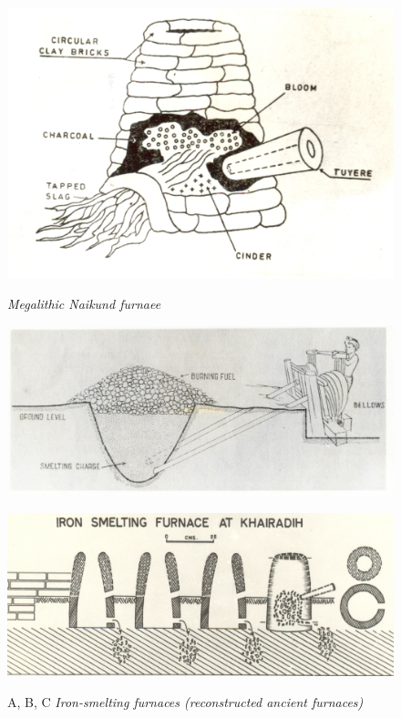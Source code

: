 \begin{figure}[H]
\includegraphics[scale=.65]{images/chapter-3/fig002a.jpg}\label{chapter-3-fig5a}

\vspace{-.3cm}

\caption*{\textit{Megalithic Naikund furnaee}}
\end{figure}

\vspace{-.5cm}

\begin{figure}[H]
\includegraphics[scale=.85]{images/chapter-3/fig002b.jpg}\label{chapter-3-fig5b}
\end{figure}
\begin{figure}[H]
\setcounter{figure}{4}
\includegraphics[scale=.85]{images/chapter-3/fig002c.jpg}\label{chapter-3-fig5c}

\vspace{-.2cm}

\caption{A, B, C \textit{Iron-smelting furnaces (reconstructed ancient furnaces)}}\label{chapter-3-fig5abc}
\end{figure}

